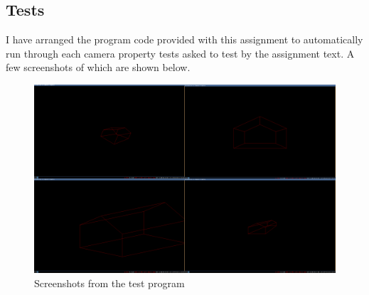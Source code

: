 \documentclass[11pt]{article}
\begin{document}
\subsection{Tests}
I have arranged the program code provided with this assignment to
automatically run through each camera property tests asked to test by the
assignment text. A few screenshots of which are shown below.
\begin{figure}[H]
    \center
    \includegraphics[scale=0.37]{figures/tests.jpg}
    \caption{Screenshots from the test program}
    \label{fig:screenshots}
\end{figure}
\end{document}
